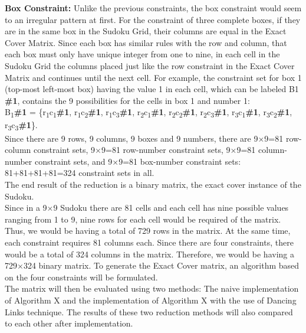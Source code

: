 \documentclass[a4paper,oneside,11pt]{report}
\newcounter{row}
\newcounter{col}
\begin{document}
\textbf{Box Constraint:} Unlike the previous constraints, the box constraint would seem to an irregular pattern at first. For the constraint of three complete boxes, if they are in the same box in the Sudoku Grid, their columns are equal in the Exact Cover Matrix. Since each box has similar rules with the row and column, that each box must only have unique integer from one to nine, in each cell in the Sudoku Grid the columns placed just like the row constraint in the Exact Cover Matrix and continues until the next cell. For example, the constraint set for box 1 (top-most left-most box) having the value 1 in each cell, which can be labeled B1 \textbf{\#1}, contains the 9 possibilities for the cells in box 1 and number 1:\\
B\textsubscript{1}\textbf{\#1} = \{r\textsubscript{1}c\textsubscript{1}\textbf{\#1}, r\textsubscript{1}c\textsubscript{2}\textbf{\#1}, r\textsubscript{1}c\textsubscript{3}\textbf{\#1}, r\textsubscript{2}c\textsubscript{1}\textbf{\#1}, r\textsubscript{2}c\textsubscript{2}\textbf{\#1}, r\textsubscript{2}c\textsubscript{3}\textbf{\#1}, r\textsubscript{3}c\textsubscript{1}\textbf{\#1}, r\textsubscript{3}c\textsubscript{2}\textbf{\#1}, r\textsubscript{3}c\textsubscript{3}\textbf{\#1}\}.\\

Since there are 9 rows, 9 columns, 9 boxes and 9 numbers, there are 9$\times$9=81 row-column constraint sets, 9$\times$9=81 row-number constraint sets, 9$\times$9=81 column-number constraint sets, and 9$\times$9=81 box-number constraint sets: 81+81+81+81=324 constraint sets in all.\\

The end result of the reduction is a binary matrix, the exact cover instance of the Sudoku.\\

Since in a 9$\times$9 Sudoku there are 81 cells and each cell has nine possible values ranging from 1 to 9, nine rows for each cell would be required of the matrix. Thus, we would be having a total of 729 rows in the matrix. At the same time, each constraint requires 81 columns each. Since there are four constraints, there would be a total of 324 columns in the matrix. Therefore, we would be having a 729$\times$324 binary matrix. To generate the Exact Cover matrix, an algorithm based on the four constraints will be formulated.\\

The matrix will then be evaluated using two methods: The naive implementation of Algorithm X and the implementation of Algorithm X with the use of Dancing Links technique. The results of  these two reduction methods will also compared to each other after implementation.
\end{document}
